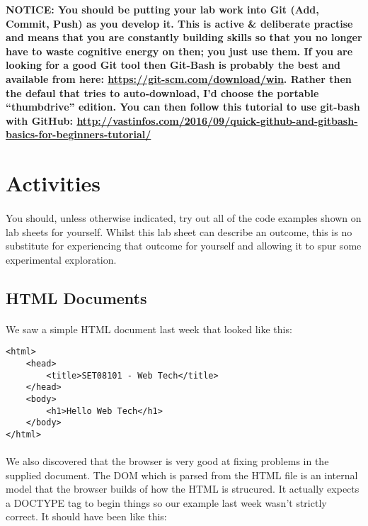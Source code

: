 \documentclass[10pt, a4paper]{article}
\begin{document}
\begin{framed}
{\bf{NOTICE:} You should be putting your lab work into Git (Add, Commit, Push) as you develop it. This is active \& deliberate practise and means that you are constantly building skills so that you no longer have to waste cognitive energy on then; you just use them. If you are looking for a good Git tool then Git-Bash is probably the best and available from here: \url{https://git-scm.com/download/win}. Rather then the defaul that tries to auto-download, I'd choose the portable ``thumbdrive'' edition. You can then follow this tutorial to use git-bash with GitHub: \url{http://vastinfos.com/2016/09/quick-github-and-gitbash-basics-for-beginners-tutorial/} }
\end{framed}


\section{Activities}

\paragraph{} You should, unless otherwise indicated, try out all of the code examples shown on lab sheets for yourself. Whilst this lab sheet can describe an outcome, this is no substitute for experiencing that outcome for yourself and allowing it to spur some experimental exploration.

\subsection{HTML Documents}
\paragraph{} We saw a simple HTML document last week that looked like this:

\begin{lstlisting}
<html>
    <head>
        <title>SET08101 - Web Tech</title>
    </head>
    <body>
        <h1>Hello Web Tech</h1>
    </body>
</html>
\end{lstlisting}

\paragraph{} We also discovered that the browser is very good at fixing problems in the supplied document. The DOM which is parsed from the HTML file is an internal model that the browser builds of how the HTML is strucured. It actually expects a DOCTYPE tag to begin things so our example last week wasn't strictly correct. It should have been like this:
\end{document}
